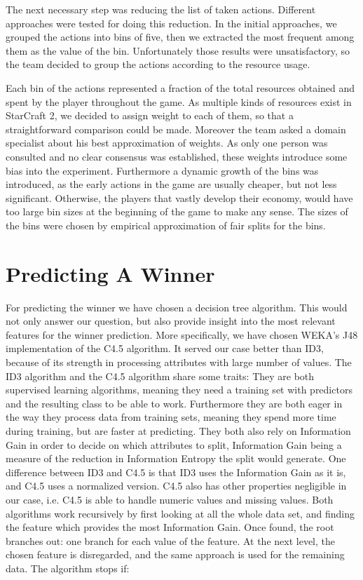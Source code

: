 \documentclass[a4paper,11pt]{article}
\begin{document}
The next necessary step was reducing the list of taken actions. Different approaches were tested for doing this reduction. In the initial approaches, we grouped the actions into bins of five, then we extracted the most frequent among them as the value of the bin. Unfortunately those results were unsatisfactory, so the team decided to group the actions according to the resource usage. 

Each bin of the actions represented a fraction of the total resources obtained and spent by the player throughout the game.
As multiple kinds of resources exist in StarCraft 2, we decided to assign weight to each of them, so that a straightforward comparison could be made. Moreover the team asked a domain specialist about his best approximation of weights.
As only one person was consulted and no clear consensus was established, these weights introduce some bias into the experiment.
Furthermore a dynamic growth of the bins was introduced, as the early actions in the game are usually cheaper, but not less significant. Otherwise, the players that vastly develop their economy, would have too large bin sizes at the beginning of the game to make any sense. The sizes of the bins were chosen by empirical approximation of fair splits for the bins.

\section{Predicting A Winner}
For predicting the winner we have chosen a decision tree algorithm. This would not only answer our question, but also provide insight into the most relevant features for the winner prediction. More specifically, we have chosen WEKA’s J48 implementation of the C4.5 algorithm. It served our case better than ID3, because of its strength in processing attributes with large number of values.
The ID3 algorithm and the C4.5 algorithm share some traits: They are both supervised learning algorithms, meaning they need a training set with predictors and the resulting class to be able to work. Furthermore they are both eager in the way they process data from training sets, meaning they spend more time during training, but are faster at predicting. They both also rely on Information Gain in order to decide on which attributes to split, Information Gain being a measure of the reduction in Information Entropy the split would generate. One difference between ID3 and C4.5 is that ID3 uses the Information Gain as it is, and C4.5 uses a normalized version. C4.5 also has other properties negligible in our case, i.e. C4.5 is able to handle numeric values and missing values.
Both algorithms work recursively by first looking at all the whole data set, and finding the feature which provides the most Information Gain. Once found, the root branches out: one branch for each value of the feature. At the next level, the chosen feature is disregarded, and the same approach is used for the remaining data. The algorithm stops if:
\end{document}
